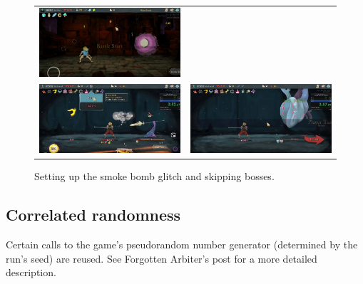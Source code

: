 \documentclass[12pt]{amsart}
\begin{document}
\begin{figure}[h]
\begin{tabular}{c|c}
        \includegraphics[scale=.3]{graphics/SmokeBomb5.png} \\ \includegraphics[scale=.3]{graphics/SmokeBomb6.png}
        &
        \includegraphics[scale=.3]{graphics/SmokeBomb7.png} 
    \end{tabular}
    \caption{Setting up the smoke bomb glitch and skipping bosses.  }
    \label{fig: smoke bomb glitch}
\end{figure}
\subsection{Correlated randomness}\label{sub-sec: RNG}
Certain calls to the game's pseudorandom number generator (determined by the run's seed) are reused.  
See Forgotten Arbiter's post \cite{ForgottenArbiterCorrelatedRandomness} for a more detailed description.  
\\
\end{document}
